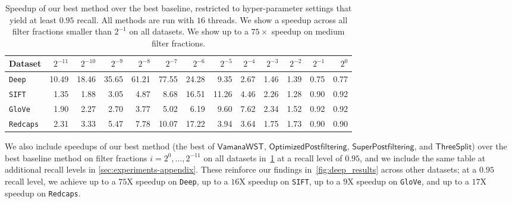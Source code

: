 \documentclass{article}
\theoremstyle{plain}
\theoremstyle{definition}
\theoremstyle{remark}
\newcommand{\datasetname}[1]{\texttt{#1}}
\newcommand{\algname}[1]{\ensuremath{\mathsf{#1}}}
\begin{document}
\begin{table}[t]
\footnotesize
\caption{Speedup of our best method over the best baseline, restricted to hyper-parameter settings that yield at least $0.95$ recall. All methods are run with $16$ threads.  We show a speedup across all filter fractions smaller than $2^{-1}$ on all datasets. We show up to a $75\times$ speedup on medium filter fractions.}
\centering
\begin{tabular}{|l|rrrrrrrrrrrr|}
\toprule
Dataset & $2^{-11}$ & $2^{-10}$ & $2^{-9}$ & $2^{-8}$ & $2^{-7}$ & $2^{-6}$ & $2^{-5}$ & $2^{-4}$ & $2^{-3}$ & $2^{-2}$ & $2^{-1}$ & $2^{0}$ \\
\hline
\datasetname{Deep} & 10.49 & 18.46 & 35.65 & 61.21 & 77.55 & 24.28 & 9.35 & 2.67 & 1.46 & 1.39 & 0.75 & 0.77 \\
\datasetname{SIFT} & 1.35 & 1.88 & 3.05 & 4.87 & 8.68 & 16.51 & 11.26 & 4.46 & 2.26 & 1.28 & 0.90 & 0.92 \\
\datasetname{GloVe} & 1.90 & 2.27 & 2.70 & 3.77 & 5.02 & 6.19 & 9.60 & 7.62 & 2.34 & 1.52 & 0.92 & 0.92 \\
\datasetname{Redcaps} & 2.31 & 3.33 & 5.47 & 7.78 & 10.07 & 17.22 & 3.94 & 3.64 & 1.75 & 1.73 & 0.90 & 0.90 \\
\hline
\end{tabular}
\vspace{0.1cm}
\label{tab:speedups}
\end{table}


We also include speedups of our best method (the best of \algname{Vamana WST}, \algname{Optimized Postfiltering}, \algname{Super Postfiltering}, and \algname{Three Split}) over the best baseline method on filter fractions $i = 2^0, \ldots, 2^{-11}$ on all datasets in~\cref{tab:speedups} at a recall level of $0.95$, and we include the same table at additional recall levels in \cref{sec:experiments-appendix}. These reinforce our findings in~\cref{fig:deep_results} across other datasets; at a $0.95$ recall level, we achieve up to a $75$X speedup on \datasetname{Deep}, up to a $16$X speedup on \datasetname{SIFT}, up to a $9$X speedup on \datasetname{GloVe}, and up to a $17$X speedup on \datasetname{Redcaps}.
\end{document}
